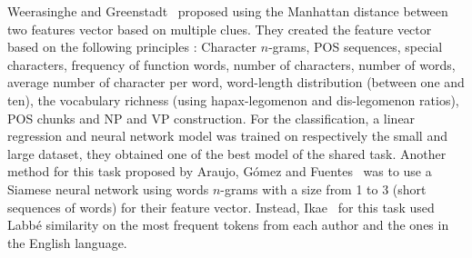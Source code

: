 Weerasinghe and Greenstadt~\cite{feature_vector_pan20} proposed using the Manhattan distance between two features vector based on multiple clues.
They created the feature vector based on the following principles : Character $n$-grams, POS sequences, special characters, frequency of function words, number of characters, number of words, average number of character per word, word-length distribution (between one and ten), the vocabulary richness (using hapax-legomenon and dis-legomenon ratios), POS chunks and NP and VP construction.
For the classification, a linear regression and neural network model was trained on respectively the small and large dataset, they obtained one of the best model of the shared task.
Another method for this task proposed by Araujo, Gómez and Fuentes~\cite{siamese_network_pan20} was to use a Siamese neural network using words $n$-grams with a size from 1 to 3 (short sequences of words) for their feature vector.
Instead, Ikae~\cite{unine_pan20_verif} for this task used Labbé similarity on the most frequent tokens from each author and the ones in the English language.
